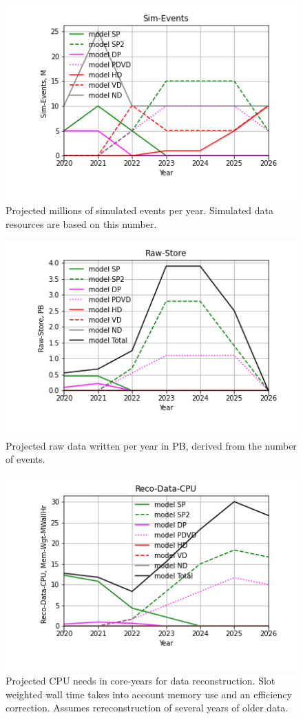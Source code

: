 \begin{figure}[h]
\centering\includegraphics[height=0.4\textwidth]{Parameters_2022-11-21-2026/Parameters_2022-11-21-2026-Sim-Events.png}
\caption{Projected millions of simulated events per year. Simulated data resources are based on this number. }
\label{fig:Sim-Events}
\end{figure}
\begin{figure}[h]
\centering\includegraphics[height=0.4\textwidth]{Parameters_2022-11-21-2026/Parameters_2022-11-21-2026-Raw-Store.png}
\caption{Projected raw data written per year in PB, derived from the number of events.}
\label{fig:Raw-Store}
\end{figure}
\begin{figure}[h]
\centering\includegraphics[height=0.4\textwidth]{Parameters_2022-11-21-2026/Parameters_2022-11-21-2026-Reco-Data-CPU.png}
\caption{Projected CPU needs in core-years for data reconstruction.              Slot weighted wall time takes into account memory use and an efficiency correction.  Assumes rereconstruction of several years of older data.}
\label{fig:Reco-Data-CPU}
\end{figure}
